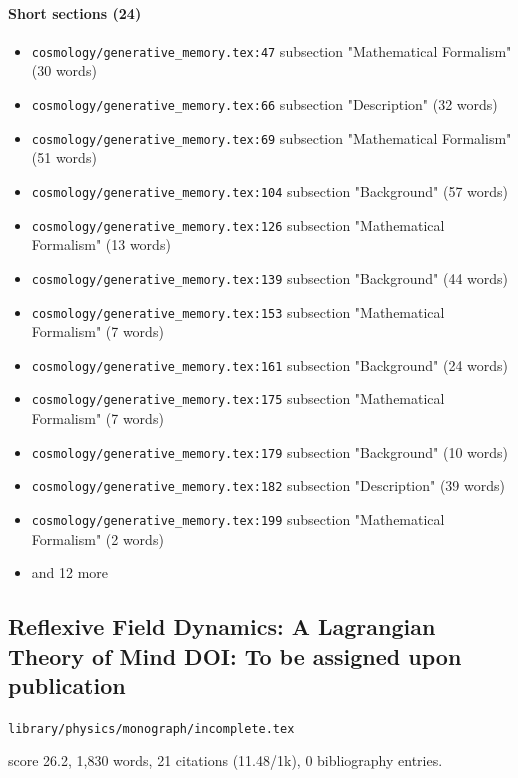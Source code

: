 \documentclass[11pt]{article}
\newcommand{\loc}[1]{{\small\color{muted}\texttt{#1}}}
\begin{document}
\paragraph{Short sections (24)}
\begin{itemize}
\item \loc{cosmology/\allowbreak{}generative\_memory.tex:47} subsection "Mathematical Formalism" (30 words)
\item \loc{cosmology/\allowbreak{}generative\_memory.tex:66} subsection "Description" (32 words)
\item \loc{cosmology/\allowbreak{}generative\_memory.tex:69} subsection "Mathematical Formalism" (51 words)
\item \loc{cosmology/\allowbreak{}generative\_memory.tex:104} subsection "Background" (57 words)
\item \loc{cosmology/\allowbreak{}generative\_memory.tex:126} subsection "Mathematical Formalism" (13 words)
\item \loc{cosmology/\allowbreak{}generative\_memory.tex:139} subsection "Background" (44 words)
\item \loc{cosmology/\allowbreak{}generative\_memory.tex:153} subsection "Mathematical Formalism" (7 words)
\item \loc{cosmology/\allowbreak{}generative\_memory.tex:161} subsection "Background" (24 words)
\item \loc{cosmology/\allowbreak{}generative\_memory.tex:175} subsection "Mathematical Formalism" (7 words)
\item \loc{cosmology/\allowbreak{}generative\_memory.tex:179} subsection "Background" (10 words)
\item \loc{cosmology/\allowbreak{}generative\_memory.tex:182} subsection "Description" (39 words)
\item \loc{cosmology/\allowbreak{}generative\_memory.tex:199} subsection "Mathematical Formalism" (2 words)
\item[] {\color{muted}\small and 12 more}
\end{itemize}
\subsection{Reflexive Field Dynamics: A Lagrangian Theory of Mind DOI: To be assigned upon publication}
\loc{library/\allowbreak{}physics/\allowbreak{}monograph/\allowbreak{}incomplete.tex}\par
score 26.2, 1,830 words, 21 citations (11.48/1k), 0 bibliography entries.
\end{document}
